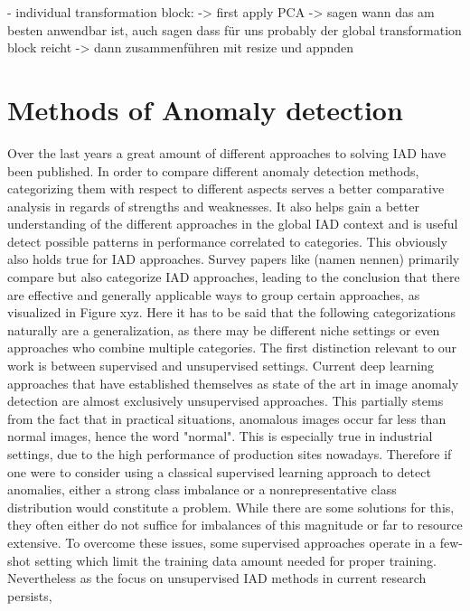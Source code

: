 - individual transformation block:
-> first apply PCA
-> sagen wann das am besten anwendbar ist, auch sagen dass für uns probably der global transformation block reicht
-> dann zusammenführen mit resize und appnden



\section{Methods of Anomaly detection}
\label{sec:IADcategs}
Over the last years a great amount of different approaches to solving IAD have been published. In order to compare different anomaly detection methods, categorizing them with respect to different 
aspects serves a better comparative analysis in regards of strengths and weaknesses.  It also helps gain a better understanding of the different approaches in the global IAD context and
is useful detect possible patterns in performance correlated to categories. This obviously also holds true for IAD approaches. Survey papers like (namen nennen) \cite{Xie_2024benchmarking} 
\cite{liu2024deep} primarily compare but also categorize IAD approaches, leading to the conclusion that there are effective and generally applicable ways to group certain approaches, as 
visualized in Figure xyz. Here it has to be said that the following categorizations naturally are a generalization, as there may be different niche settings or even approaches who combine multiple categories.
\newline
The first distinction relevant to our work is between supervised and unsupervised settings. Current deep learning approaches that have established themselves as state of the art in image anomaly detection 
are almost exclusively unsupervised approaches. This partially stems from the fact 
that in practical situations, anomalous images occur far less than normal images, hence the word "normal". This is especially true in industrial settings, due to the high performance of 
production sites nowadays. Therefore if one were to consider using a classical supervised learning approach to detect anomalies, either a strong class imbalance or a nonrepresentative class 
distribution would constitute a problem. While there are some solutions for this, they often either do not suffice for imbalances of this magnitude or far to resource extensive. To overcome 
these issues, some supervised approaches \cite{Chu_2020supervised} operate in a few-shot setting which limit the training data amount needed for proper training. Nevertheless as the focus on 
unsupervised IAD methods in current research persists, 
